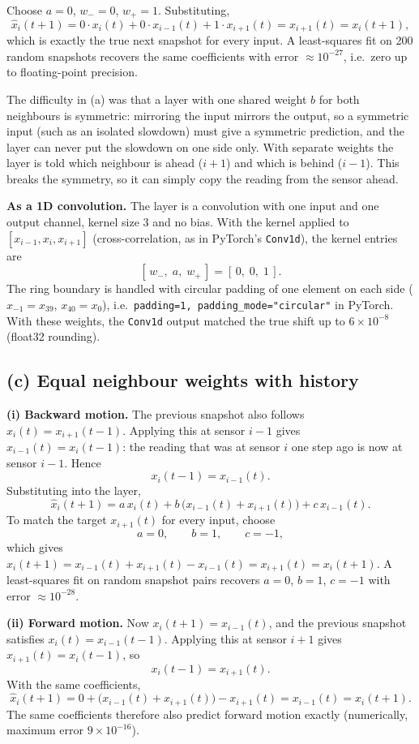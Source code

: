 \documentclass[11pt, a4paper]{article}
\begin{document}
Choose $a = 0$, $w_- = 0$, $w_+ = 1$. Substituting,
\[
\hat{x}_i(t+1) = 0 \cdot x_i(t) + 0 \cdot x_{i-1}(t) + 1 \cdot x_{i+1}(t) = x_{i+1}(t) = x_i(t+1),
\]
which is exactly the true next snapshot for every input. A least-squares fit on 200 random snapshots recovers the same coefficients with error $\approx 10^{-27}$, i.e.\ zero up to floating-point precision.

The difficulty in (a) was that a layer with one shared weight $b$ for both neighbours is symmetric: mirroring the input mirrors the output, so a symmetric input (such as an isolated slowdown) must give a symmetric prediction, and the layer can never put the slowdown on one side only. With separate weights the layer is told which neighbour is ahead ($i + 1$) and which is behind ($i - 1$). This breaks the symmetry, so it can simply copy the reading from the sensor ahead.

\textbf{As a 1D convolution.} The layer is a convolution with one input and one output channel, kernel size 3 and no bias. With the kernel applied to $[x_{i-1}, x_i, x_{i+1}]$ (cross-correlation, as in PyTorch's \texttt{Conv1d}), the kernel entries are
\[
[\,w_-,\; a,\; w_+\,] = [\,0,\; 0,\; 1\,].
\]
The ring boundary is handled with circular padding of one element on each side ($x_{-1} = x_{39}$, $x_{40} = x_0$), i.e.\ \texttt{padding=1, padding\_mode="circular"} in PyTorch. With these weights, the \texttt{Conv1d} output matched the true shift up to $6 \times 10^{-8}$ (float32 rounding).

\subsection*{(c) Equal neighbour weights with history}

\textbf{(i) Backward motion.} The previous snapshot also follows $x_i(t) = x_{i+1}(t-1)$. Applying this at sensor $i - 1$ gives $x_{i-1}(t) = x_i(t-1)$: the reading that was at sensor $i$ one step ago is now at sensor $i - 1$. Hence
\[
x_i(t-1) = x_{i-1}(t).
\]
Substituting into the layer,
\[
\hat{x}_i(t+1) = a\,x_i(t) + b\,\big(x_{i-1}(t) + x_{i+1}(t)\big) + c\,x_{i-1}(t).
\]
To match the target $x_{i+1}(t)$ for every input, choose
\[
a = 0, \qquad b = 1, \qquad c = -1,
\]
which gives $\hat{x}_i(t+1) = x_{i-1}(t) + x_{i+1}(t) - x_{i-1}(t) = x_{i+1}(t) = x_i(t+1)$. A least-squares fit on random snapshot pairs recovers $a = 0$, $b = 1$, $c = -1$ with error $\approx 10^{-28}$.

\textbf{(ii) Forward motion.} Now $x_i(t+1) = x_{i-1}(t)$, and the previous snapshot satisfies $x_i(t) = x_{i-1}(t-1)$. Applying this at sensor $i + 1$ gives $x_{i+1}(t) = x_i(t-1)$, so
\[
x_i(t-1) = x_{i+1}(t).
\]
With the same coefficients,
\[
\hat{x}_i(t+1) = 0 + \big(x_{i-1}(t) + x_{i+1}(t)\big) - x_{i+1}(t) = x_{i-1}(t) = x_i(t+1).
\]
The same coefficients therefore also predict forward motion exactly (numerically, maximum error $9 \times 10^{-16}$).
\end{document}

